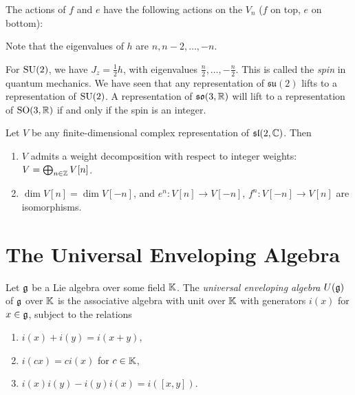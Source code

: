 \begin{remark}
  The actions of $f$ and $e$ have the
  following actions on the $V_n$ ($f$ on
  top, $e$ on bottom):
  \begin{center}
  \end{center}
  Note that the eigenvalues of $h$
  are $n, n - 2, \dots, -n$.

  For $\operatorname{SU}(2)$, we have
  $J_z = \frac{1}{2} h$,
  with eigenvalues
  $\frac{n}{2}, \dots, -\frac{n}{2}$.
  This is called the \emph{spin}
  in quantum mechanics.
  We have seen that any representation
  of $\mathfrak{su}(2)$ lifts to
  a representation of $\operatorname{SU}(2)$.
  A representation of $\mathfrak{so}(3, \mathbb{R})$
  will lift to a representation of
  $\operatorname{SO}(3, \mathbb{R})$ if and only if
  the spin is an integer.
\end{remark}

\begin{theorem}
  Let $V$ be any finite-dimensional
  complex representation of
  $\mathfrak{sl}(2, \mathbb{C})$. Then
  \begin{enumerate}
    \item $V$ admits a weight
      decomposition with respect to
      integer weights:
      $V = \bigoplus_{n \in \mathbb{Z}} V[n]$.
    \item $\dim V[n] = \dim V[-n]$, and
      $e^n : V[n] \to V[-n]$,
      $f^n : V[-n] \to V[n]$
      are isomorphisms.
  \end{enumerate}
\end{theorem}

\section{The Universal Enveloping Algebra}

\begin{definition}
  Let $\mathfrak{g}$ be a Lie algebra over some field
  $\mathbb{K}$. The
  \emph{universal enveloping algebra}
  $U(\mathfrak{g})$ of $\mathfrak{g}$ over $\mathbb{K}$ is the
  associative algebra with unit
  over $\mathbb{K}$ with generators
  $i(x)$ for $x \in \mathfrak{g}$,
  subject to the relations
  \begin{enumerate}
    \item $i(x) + i(y) = i(x + y)$,
    \item $i(cx) = ci(x)$ for $c \in \mathbb{K}$,
    \item $i(x) i(y) - i(y) i(x) = i([x, y])$.
  \end{enumerate}
\end{definition}

